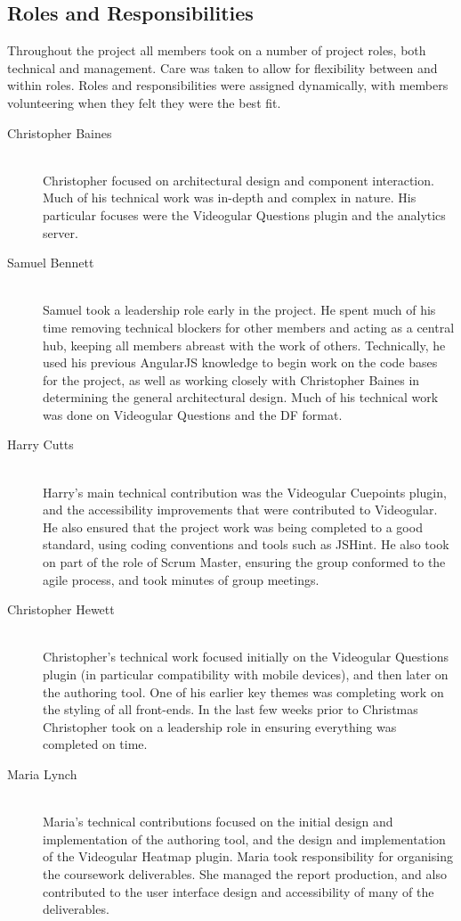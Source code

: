 \subsection{Roles and Responsibilities}

Throughout the project all members took on a number of project roles, both technical and management. Care was taken to allow for flexibility between and within roles. Roles and responsibilities were assigned dynamically, with members volunteering when they felt they were the best fit.

\begin{description}
	\item[Christopher Baines] \hfill \\
		Christopher focused on architectural design and component interaction. Much of his technical work was in-depth and complex in nature. His particular focuses were the Videogular Questions plugin and the analytics server.
	\item[Samuel Bennett] \hfill \\
		Samuel took a leadership role early in the project. He spent much of his time removing technical blockers for other members and acting as a central hub, keeping all members abreast with the work of others. Technically, he used his previous \gls{AngularJS} knowledge to begin work on the code bases for the project, as well as working closely with Christopher Baines in determining the general architectural design. Much of his technical work was done on Videogular Questions and the \gls{DF} format.
	\item[Harry Cutts] \hfill \\
		Harry's main technical contribution was the Videogular Cuepoints plugin, and the accessibility improvements that were contributed to \gls{Videogular}. He also ensured that the project work was being completed to a good standard, using coding conventions and tools such as JSHint. He also took on part of the role of Scrum Master, ensuring the group conformed to the agile process, and took minutes of group meetings.
	\item[Christopher Hewett] \hfill \\
		Christopher's technical work focused initially on the Videogular Questions plugin (in particular compatibility with mobile devices), and then later on the authoring tool. One of his earlier key themes was completing work on the styling of all front-ends. In the last few weeks prior to Christmas Christopher took on a leadership role in ensuring everything was completed on time.
	\item[Maria Lynch] \hfill \\
		Maria's technical contributions focused on the initial design and implementation of the authoring tool, and the design and implementation of the Videogular Heatmap plugin. Maria took responsibility for organising the coursework deliverables. She managed the report production, and also contributed to the user interface design and accessibility of many of the deliverables.
\end{description}

